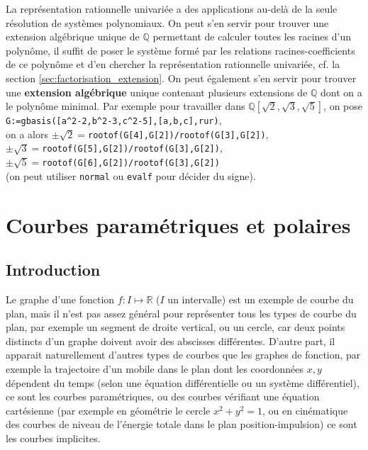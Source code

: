 \documentclass[a4paper,11pt]{article}
\begin{document}
\begin{giacjshere}
La repr\'esentation rationnelle univari\'ee a des applications
au-del\`a de la seule r\'esolution de syst\`emes polynomiaux.
On peut s'en servir pour trouver une extension alg\'ebrique unique de
$\mathbb{Q}$ permettant de calculer toutes les racines d'un polyn\^ome, 
il suffit de poser le syst\`eme form\'e par les relations
racines-coefficients de ce polyn\^ome et d'en chercher la
repr\'esentation rationnelle univari\'ee, cf. la section 
\ref{sec:factorisation_extension}.
On peut \'egalement s'en servir pour trouver une 
{\bf extension
alg\'ebrique} 
unique contenant plusieurs extensions de $\mathbb{Q}$
dont on a le polyn\^ome minimal. Par exemple pour
travailler dans $\mathbb{Q}[\sqrt{2},\sqrt{3},\sqrt{5}]$, on pose \\
\verb|G:=gbasis([a^2-2,b^2-3,c^2-5],[a,b,c],rur)|,\\
on a alors $\pm \sqrt{2}=$\verb|rootof(G[4],G[2])/rootof(G[3],G[2])|,\\
$\pm \sqrt{3}=$\verb|rootof(G[5],G[2])/rootof(G[3],G[2])|,\\
$\pm \sqrt{5}=$\verb|rootof(G[6],G[2])/rootof(G[3],G[2])|\\
(on peut utiliser \verb|normal| ou \verb|evalf| pour d\'ecider du signe).

\section{Courbes param\'etriques et polaires} \label{sec:courbes}

\subsection{Introduction}
Le graphe d'une fonction $f: I \mapsto \mathbb{R}$ ($I$ un intervalle)
est un exemple de courbe du plan, mais il
n'est pas assez g\'en\'eral pour repr\'esenter tous les types de
courbe du plan, par exemple un segment de droite vertical, ou
un cercle, car deux points distincts d'un graphe doivent avoir
des abscisses diff\'erentes. D'autre part, il apparait naturellement
d'autres types de courbes que les graphes de fonction, par exemple
la trajectoire d'un mobile dans le plan dont les coordonn\'ees $x,y$
d\'ependent du temps (selon une \'equation diff\'erentielle ou
un syst\`eme diff\'erentiel), ce sont les courbes param\'etriques,
ou des courbes v\'erifiant une
\'equation cart\'esienne (par exemple en g\'eom\'etrie
le cercle $x^2+y^2=1$, ou en cin\'ematique des courbes
de niveau de l'\'energie totale dans le plan position-impulsion)
ce sont les courbes implicites.


\end{giacjshere}
\end{document}
